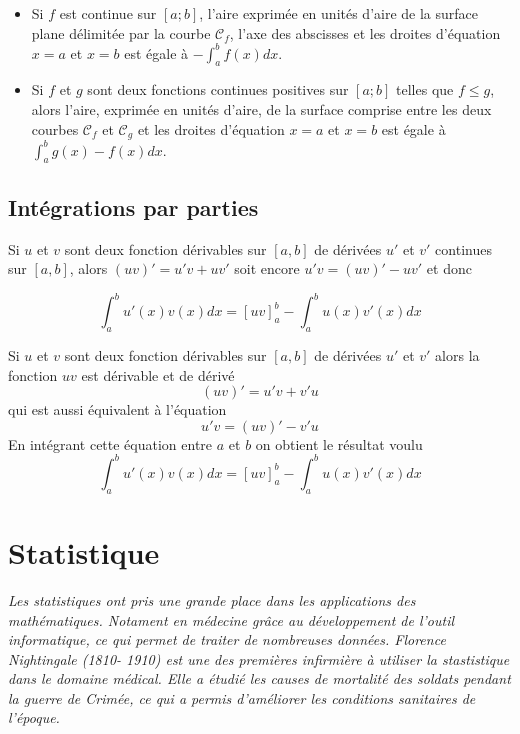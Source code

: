 \documentclass[french]{book}
\newcommand{\ds}{\displaystyle}
\begin{document}
\begin{prop}
\begin{itemize}
\item[$\bullet$] Si $f$ est continue sur $[a;b]$, l'aire exprimée en unités d'aire de la surface plane délimitée par la courbe $\mathcal{C}_f$, l'axe des abscisses et les droites d'équation $x=a$ et $x=b$ est égale à $-\int_{a}^{b}f(x)dx$.
\item[$\bullet$] Si $f$ et $g$ sont deux fonctions continues positives sur $[a;b]$ telles que $f\leq g$, alors l'aire, exprimée en unités d'aire, de la surface comprise entre les deux courbes $\mathcal{C}_f$ et $\mathcal{C}_g$ et les droites d'équation $x=a$ et $x=b$ est égale à $\int_{a}^{b}g(x)-f(x)dx$.
\end{itemize}
\end{prop}

\section{Intégrations par parties} 


\begin{prop}
  Si $u$ et $v$ sont deux fonction dérivables sur $[a,b]$ de dérivées $u'$ et $v'$ continues sur $[a,b]$, alors $(uv)'=u'v+uv'$ soit encore $u'v=(uv)'-uv'$  et donc

$$ \ds\int_a^bu'(x)v(x)d x=[uv]_a^b-\int_a^bu(x)v'(x)d x $$
\end{prop}

\begin{demo}
 Si $u$ et $v$ sont deux fonction dérivables sur $[a,b]$ de dérivées $u'$ et $v'$ alors la fonction $uv$ est dérivable et de dérivé 
 $$(uv)'=u'v+v'u$$
 qui est aussi équivalent à  l'équation $$ u'v=(uv)'-v'u $$
En intégrant cette équation entre $a$ et $b$ on obtient le résultat voulu
$$ \ds\int_a^bu'(x)v(x)d x=[uv]_a^b-\int_a^bu(x)v'(x)d x $$
\end{demo}
\chapter{Statistique}
\textit{Les statistiques ont pris une grande place dans les applications des mathématiques. Notament en médecine grâce au développement de l'outil informatique, ce qui permet de traiter de nombreuses données. Florence Nightingale (1810- 1910) est une des premières infirmière à utiliser la stastistique dans le domaine médical. Elle a étudié les causes de mortalité des soldats pendant la guerre de Crimée, ce qui a permis d'améliorer les conditions sanitaires de l'époque. } \\
\end{document}
